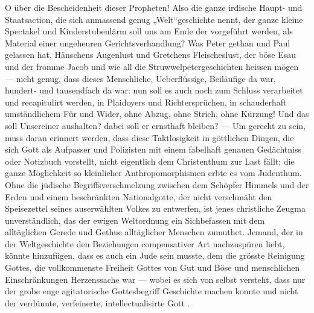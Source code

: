 \begin{BookVerse}
\Stanza
{}
\end{BookVerse}
O über die Bescheidenheit dieser Propheten! Also die ganze irdische Haupt- und Staatsaction, die sich anmassend genug „Welt“geschichte nennt, der ganze kleine Spectakel und Kinderstubenlärm soll uns am Ende der   vorgeführt werden, als Material einer ungeheuren Gerichtsverhandlung? Was Peter gethan und Paul gelassen hat, Hänschens Augenlust und Gretchens Fleischeslust, der böse Esau und der fromme Jacob und wie all die Struwwelpetergeschichten heissen mögen — nicht genug, dass dieses Menschliche, Ueberflüssige, Beiläufige da war, hundert- und tausendfach da war: nun soll es auch noch zum Schluss verarbeitet und recapitulirt werden, in Plaidoyers und Richtersprüchen, in schauderhaft umständlichem Für und Wider, ohne Abzug, ohne Strich, ohne Kürzung! Und das soll Unsereiner aushalten? dabei soll er ernsthaft bleiben? — Um gerecht zu sein, muss daran erinnert werden, dass diese Taktlosigkeit in göttlichen Dingen, die sich Gott als Aufpasser und Polizisten mit einem fabelhaft genauen Gedächtniss oder Notizbuch vorstellt, nicht eigentlich dem Christenthum zur Last fällt; die ganze Möglichkeit so kleinlicher Anthropomorphismen erbte es vom Judenthum. Ohne die jüdische Begriffsverschmelzung zwischen dem Schöpfer Himmels und der Erden und einem beschränkten Nationalgotte, der nicht verschmäht den Speisezettel seines auserwählten Volkes zu entwerfen, ist jenes christliche Zeugma unverständlich, das der ewigen Weltordnung ein Sichbefassen mit dem alltäglichen Gerede und Gethue alltäglicher Menschen zumuthet. Jemand, der in der Weltgeschichte den Beziehungen compensativer Art nachzuspüren liebt, könnte hinzufügen, dass es auch ein Jude sein musste, dem die grösste Reinigung Gottes, die vollkommenste Freiheit Gottes von Gut und Böse und menschlichen Einschränkungen Herzenssache war — wobei es sich von selbst versteht, dass nur der grobe enge agitatorische Gottesbegriff Geschichte machen konnte und nicht der verdünnte, verfeinerte, intellectualisirte Gott .
\par

